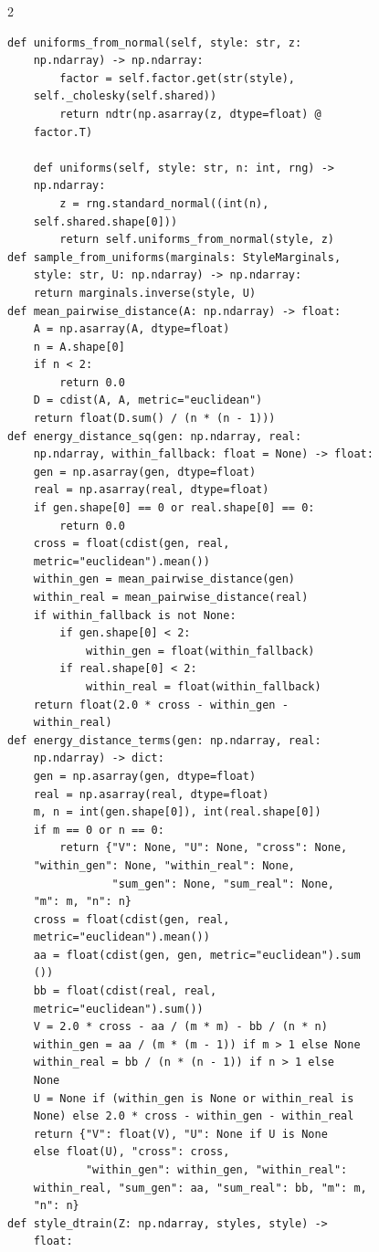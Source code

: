 \begin{multicols}{2}
\begin{Verbatim}[fontsize=\scriptsize]
    def uniforms_from_normal(self, style: str, z:
    np.ndarray) -> np.ndarray:
        factor = self.factor.get(str(style),
    self._cholesky(self.shared))
        return ndtr(np.asarray(z, dtype=float) @
    factor.T)

    def uniforms(self, style: str, n: int, rng) ->
    np.ndarray:
        z = rng.standard_normal((int(n),
    self.shared.shape[0]))
        return self.uniforms_from_normal(style, z)
def sample_from_uniforms(marginals: StyleMarginals,
    style: str, U: np.ndarray) -> np.ndarray:
    return marginals.inverse(style, U)
def mean_pairwise_distance(A: np.ndarray) -> float:
    A = np.asarray(A, dtype=float)
    n = A.shape[0]
    if n < 2:
        return 0.0
    D = cdist(A, A, metric="euclidean")
    return float(D.sum() / (n * (n - 1)))
def energy_distance_sq(gen: np.ndarray, real:
    np.ndarray, within_fallback: float = None) -> float:
    gen = np.asarray(gen, dtype=float)
    real = np.asarray(real, dtype=float)
    if gen.shape[0] == 0 or real.shape[0] == 0:
        return 0.0
    cross = float(cdist(gen, real,
    metric="euclidean").mean())
    within_gen = mean_pairwise_distance(gen)
    within_real = mean_pairwise_distance(real)
    if within_fallback is not None:
        if gen.shape[0] < 2:
            within_gen = float(within_fallback)
        if real.shape[0] < 2:
            within_real = float(within_fallback)
    return float(2.0 * cross - within_gen -
    within_real)
def energy_distance_terms(gen: np.ndarray, real:
    np.ndarray) -> dict:
    gen = np.asarray(gen, dtype=float)
    real = np.asarray(real, dtype=float)
    m, n = int(gen.shape[0]), int(real.shape[0])
    if m == 0 or n == 0:
        return {"V": None, "U": None, "cross": None,
    "within_gen": None, "within_real": None,
                "sum_gen": None, "sum_real": None,
    "m": m, "n": n}
    cross = float(cdist(gen, real,
    metric="euclidean").mean())
    aa = float(cdist(gen, gen, metric="euclidean").sum
    ())
    bb = float(cdist(real, real,
    metric="euclidean").sum())
    V = 2.0 * cross - aa / (m * m) - bb / (n * n)
    within_gen = aa / (m * (m - 1)) if m > 1 else None
    within_real = bb / (n * (n - 1)) if n > 1 else
    None
    U = None if (within_gen is None or within_real is
    None) else 2.0 * cross - within_gen - within_real
    return {"V": float(V), "U": None if U is None
    else float(U), "cross": cross,
            "within_gen": within_gen, "within_real":
    within_real, "sum_gen": aa, "sum_real": bb, "m": m,
    "n": n}
def style_dtrain(Z: np.ndarray, styles, style) ->
    float:

\end{Verbatim}
\end{multicols}
